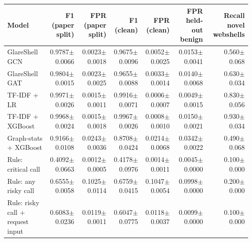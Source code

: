 \begin{tabular}{@{}lrrrrrr@{}}
\toprule
Model & F1 (paper split) & FPR (paper split) & F1 (clean) & FPR (clean) & FPR held-out benign & Recall novel webshells \\ \midrule
GlareShell GCN & 0.9787$\pm$0.0066 & 0.0023$\pm$0.0018 & 0.9675$\pm$0.0096 & 0.0052$\pm$0.0025 & 0.0153$\pm$0.0041 & 0.560$\pm$0.068 \\
GlareShell GAT & 0.9804$\pm$0.0015 & 0.0023$\pm$0.0025 & 0.9655$\pm$0.0088 & 0.0033$\pm$0.0014 & 0.0140$\pm$0.0068 & 0.630$\pm$0.034 \\
TF-IDF + LR & 0.9971$\pm$0.0026 & 0.0015$\pm$0.0011 & 0.9916$\pm$0.0071 & 0.0006$\pm$0.0007 & 0.0049$\pm$0.0015 & 0.830$\pm$0.056 \\
TF-IDF + XGBoost & 0.9968$\pm$0.0024 & 0.0015$\pm$0.0018 & 0.9967$\pm$0.0026 & 0.0008$\pm$0.0010 & 0.0150$\pm$0.0021 & 0.930$\pm$0.034 \\
Graph-stats + XGBoost & 0.9166$\pm$0.0108 & 0.0243$\pm$0.0036 & 0.8708$\pm$0.0424 & 0.0214$\pm$0.0068 & 0.0342$\pm$0.0022 & 0.490$\pm$0.068 \\
Rule: critical call & 0.4092$\pm$0.0663 & 0.0012$\pm$0.0005 & 0.4178$\pm$0.0976 & 0.0014$\pm$0.0011 & 0.0045$\pm$0.0000 & 0.100$\pm$0.000 \\
Rule: any risky call & 0.6555$\pm$0.0058 & 0.1025$\pm$0.0114 & 0.6759$\pm$0.0415 & 0.1047$\pm$0.0054 & 0.0998$\pm$0.0000 & 0.200$\pm$0.000 \\
Rule: risky call + request input & 0.6083$\pm$0.0236 & 0.0119$\pm$0.0011 & 0.6047$\pm$0.0775 & 0.0118$\pm$0.0037 & 0.0099$\pm$0.0000 & 0.100$\pm$0.000 \\
\bottomrule
\end{tabular}
